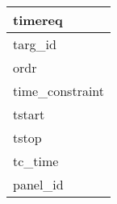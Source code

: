 \documentclass{article}
\begin{document}

\begin{tabular}{|l|} \hline
\textbf{timereq} \\ \hline
targ\_id \\ \hline
ordr \\ \hline
time\_constraint \\ \hline
tstart \\ \hline
tstop \\ \hline
tc\_time \\ \hline
panel\_id \\ \hline
\end{tabular}
\end{document}
